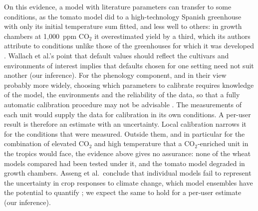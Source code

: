 On this evidence, a model with literature parameters can transfer to some conditions, as the tomato model did to a high-technology Spanish greenhouse with only its initial temperature sum fitted, and less well to others: in growth chambers at 1{,}000~ppm CO$_2$ it overestimated yield by a third, which its authors attribute to conditions unlike those of the greenhouses for which it was developed \cite[Sections~4.3 and 5.2--5.3, pp.~389--391]{vanthoor2011tomato}. Wallach et al.'s point that default values should reflect the cultivars and environments of interest \cite[Section~4.2, p.~8]{wallach2021chaos} implies that defaults chosen for one setting need not suit another (our inference). For the phenology component, and in their view probably more widely, choosing which parameters to calibrate requires knowledge of the model, the environments and the reliability of the data, so that a fully automatic calibration procedure may not be advisable \cite[Section~4.4, p.~9]{wallach2021chaos}. The measurements of each unit would supply the data for calibration in its own conditions. A per-user result is therefore an estimate with an uncertainty. Local calibration narrows it for the conditions that were measured. Outside them, and in particular for the combination of elevated CO$_2$ and high temperature that a CO$_2$-enriched unit in the tropics would face, the evidence above gives no assurance: none of the wheat models compared had been tested under it, and the tomato model degraded in growth chambers. Asseng et al.\ conclude that individual models fail to represent the uncertainty in crop responses to climate change, which model ensembles have the potential to quantify \cite[p.~830]{asseng2013uncertainty}; we expect the same to hold for a per-user estimate (our inference).

